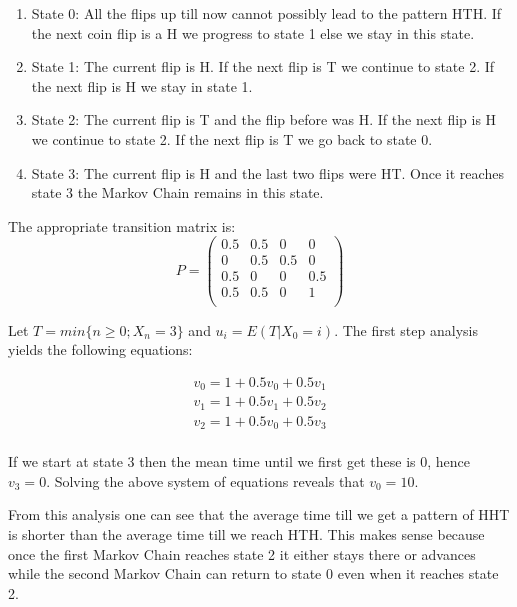 \documentclass[10pt,a4paper]{article}
\begin{document}
\begin{flushleft}
\begin{enumerate}
    \item State 0: All the flips up till now cannot possibly lead to the pattern
    HTH. If the next coin flip is a H we progress to state 1 else
    we stay in this state.
    \item State 1: The current flip is H. If the next flip is T we
    continue to state 2. If the next flip is H we stay in state
    1.
    \item State 2: The current flip is T and the flip before was
    H. If the next flip is H we continue to state 2. If the next flip
    is T we go back to state 0.
    \item State 3: The current flip is H and the last two flips
    were HT. Once it reaches state 3 the Markov Chain remains in this state.
\end{enumerate}
The appropriate transition matrix is:
\[ P = \left ( \begin{array}{cccc}
 0.5 & 0.5 & 0 & 0  \\
 0 & 0.5 & 0.5 & 0  \\
 0.5 & 0 & 0 & 0.5  \\
 0.5 & 0.5 & 0 & 1  \\
\end{array} \right) \]

Let $T=min\{n \geq 0 ; X_n=3\}$ and $u_i=E(T|X_0=i)$. The first
step analysis yields the following equations:

\begin{eqnarray*}
v_0=1+0.5v_0+0.5v_1 \\
v_1=1+0.5v_1+0.5v_2 \\
v_2=1+0.5v_0+0.5v_3 \\
\end{eqnarray*}

If we start at state 3 then the mean time until we first get these
is 0, hence $v_3=0$. Solving the above system of equations reveals
that $v_0=10$.

From this analysis one can see that the average time till we get a
pattern of HHT is shorter than the average time till we reach HTH.
This makes sense because once the first Markov Chain reaches state
2 it either stays there or advances while the second Markov Chain
can return to state 0 even when it reaches state 2.
\begin{eqnarray*}
\\
\end{eqnarray*}


\end{flushleft}
\end{document}
